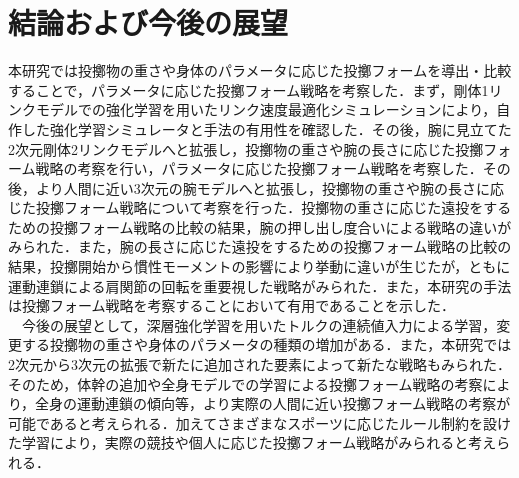 \documentclass[dvipdfmx]{jarticle}
\begin{document}
\small

% 
% 
% 
% 


\section{結論および今後の展望}
本研究では投擲物の重さや身体のパラメータに応じた投擲フォームを導出・比較することで，パラメータに応じた投擲フォーム戦略を考察した．まず，剛体1リンクモデルでの強化学習を用いたリンク速度最適化シミュレーションにより，自作した強化学習シミュレータと手法の有用性を確認した．その後，腕に見立てた2次元剛体2リンクモデルへと拡張し，投擲物の重さや腕の長さに応じた投擲フォーム戦略の考察を行い，パラメータに応じた投擲フォーム戦略を考察した．その後，より人間に近い3次元の腕モデルへと拡張し，投擲物の重さや腕の長さに応じた投擲フォーム戦略について考察を行った．投擲物の重さに応じた遠投をするための投擲フォーム戦略の比較の結果，腕の押し出し度合いによる戦略の違いがみられた．また，腕の長さに応じた遠投をするための投擲フォーム戦略の比較の結果，投擲開始から慣性モーメントの影響により挙動に違いが生じたが，ともに運動連鎖による肩関節の回転を重要視した戦略がみられた．また，本研究の手法は投擲フォーム戦略を考察することにおいて有用であることを示した．\\
　今後の展望として，深層強化学習を用いたトルクの連続値入力による学習，変更する投擲物の重さや身体のパラメータの種類の増加がある．また，本研究では2次元から3次元の拡張で新たに追加された要素によって新たな戦略もみられた．そのため，体幹の追加や全身モデルでの学習による投擲フォーム戦略の考察により，全身の運動連鎖の傾向等，より実際の人間に近い投擲フォーム戦略の考察が可能であると考えられる．加えてさまざまなスポーツに応じたルール制約を設けた学習により，実際の競技や個人に応じた投擲フォーム戦略がみられると考えられる．



\footnotesize


\normalsize
\end{document}

